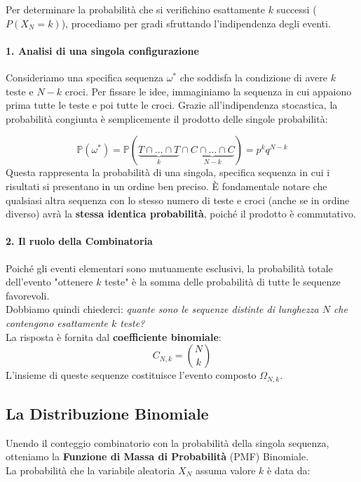 Per determinare la probabilità che si verifichino esattamente $k$ successi ($P(X_N=k)$), procediamo per gradi sfruttando l'indipendenza degli eventi.

\paragraph{1. Analisi di una singola configurazione}
Consideriamo una specifica sequenza $\omega^*$ che soddisfa la condizione di avere $k$ teste e $N-k$ croci. Per fissare le idee, immaginiamo la sequenza in cui appaiono prima tutte le teste e poi tutte le croci. Grazie all'indipendenza stocastica, la probabilità congiunta è semplicemente il prodotto delle singole probabilità:

\[
\mathbb{P}(\omega^*) = \mathbb{P}(\underbrace{T \cap \dots \cap T}_{k} \cap \underbrace{C \cap \dots \cap C}_{N-k}) = p^k q^{N-k}
\]
Questa rappresenta la probabilità di una singola, specifica sequenza in cui i risultati si presentano in un ordine ben preciso.
È fondamentale notare che qualsiasi altra sequenza con lo stesso numero di teste e croci (anche se in ordine diverso) avrà la \textbf{stessa identica probabilità}, poiché il prodotto è commutativo.

\paragraph{2. Il ruolo della Combinatoria}
Poiché gli eventi elementari sono mutuamente esclusivi, la probabilità totale dell'evento "ottenere $k$ teste" è la somma delle probabilità di tutte le sequenze favorevoli.
\\Dobbiamo quindi chiederci: \textit{quante sono le sequenze distinte di lunghezza $N$ che contengono esattamente $k$ teste?}
\\La risposta è fornita dal \textbf{coefficiente binomiale}:
\[ C_{N,k} = \binom{N}{k} \]
L'insieme di queste sequenze costituisce l'evento composto $\Omega_{N,k}$.

\subsection{La Distribuzione Binomiale}

Unendo il conteggio combinatorio con la probabilità della singola sequenza, otteniamo la \textbf{Funzione di Massa di Probabilità} (PMF) Binomiale.
\\La probabilità che la variabile aleatoria $X_N$ assuma valore $k$ è data da:

